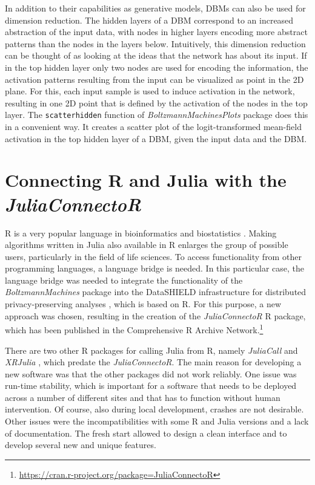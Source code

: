 \documentclass[12pt]{article}
\newcommand{\inlinecode}[1]{\texttt{#1}}
\newcommand{\apkg}[1]{\emph{#1}}
\begin{document}
In addition to their capabilities as generative models, DBMs can also be used for dimension reduction.
The hidden layers of a DBM correspond to an increased abstraction of the input data,
with nodes in higher layers encoding more abstract patterns than the nodes in the layers below.
Intuitively, this dimension reduction can be thought of as looking at the ideas that the network has about its input.
If in the top hidden layer only two nodes are used for encoding the information, the activation patterns resulting from the input can be visualized as point in the 2D plane.
For this, each input sample is used to induce activation in the network, resulting in one 2D point that is defined by the activation of the nodes in the top layer.
The \inlinecode{scatterhidden} function of \apkg{BoltzmannMachinesPlots} package does this in a convenient way.
It creates a scatter plot of the logit-transformed mean-field activation in the top hidden layer of a DBM, given the input data and the DBM.



\FloatBarrier
\clearpage
\section{Connecting R and Julia with the \apkg{JuliaConnectoR}}\label{juliaconnectorpart}

R is a very popular language in bioinformatics and biostatistics \citep{bioconductor}.
Making algorithms written in Julia also available in R enlarges the group of possible users, particularly in the field of life sciences.
To access functionality from other programming languages, a language bridge is needed.
In this particular case, the language bridge was needed to integrate the functionality of the \apkg{BoltzmannMachines} package into the DataSHIELD infrastructure for distributed privacy-preserving analyses \citep{gaye_datashield}, which is based on R.
For this purpose, a new approach was chosen, resulting in the creation of the \apkg{JuliaConnectoR} R package, which has been published in the Comprehensive R Archive Network.\footnote{\url{https://cran.r-project.org/package=JuliaConnectoR}}

There are two other R packages for calling Julia from R, namely \apkg{JuliaCall} \citep{JuliaCallPaper} and \apkg{XRJulia} \citep{chambersExtendingR}, which predate the \apkg{JuliaConnectoR}.
The main reason for developing a new software was that the other packages did not work reliably.
One issue was run-time stability, which is important for a software that needs to be deployed across a number of different sites and that has to function without human intervention.
Of course, also during local development, crashes are not desirable.
Other issues were the incompatibilities with some R and Julia versions and a lack of documentation.
The fresh start allowed to design a clean interface and to develop several new and unique features.
\end{document}
